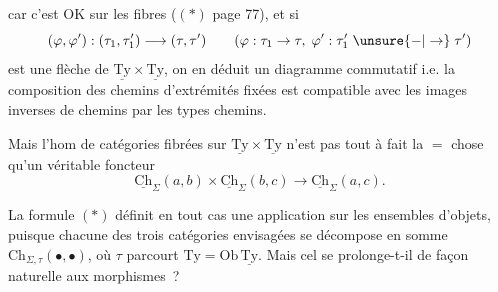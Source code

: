 car c'est OK sur les fibres ($( * )$ page 77), et si
\[
(\varphi,\varphi'):(\tau_1,\tau'_1)\longrightarrow(\tau,\tau')\qquad
(\varphi:\tau_1\to\tau,\;\varphi':\tau'_1\mathrel{\unsure{-|\to}}\tau')
\]
est une flèche de $\underline{\mathrm{Ty}}\times\underline{\mathrm{Ty}}$, on en déduit un diagramme commutatif 
i.e. la composition des chemins  d'extrémités fixées est compatible avec les images inverses de chemins par   les types  chemins.

Mais l'hom  de catégories fibrées sur $\underline{\mathrm{Ty}}\times\underline{\mathrm{Ty}}$ n'est pas tout à fait la $=$ chose qu'un véritable foncteur
\[
\underline{\mathrm{Ch}}_\Sigma(a,b)\times\underline{\mathrm{Ch}}_\Sigma(b,c)\longrightarrow\underline{\mathrm{Ch}}_\Sigma(a,c).\tag*{$(*)$}
\]

La formule $(*)$  définit en tout cas une application sur les ensembles d'objets, puisque  chacune des trois catégories envisagées se décompose en somme  $\mathrm{Ch}_{\Sigma,\tau}(\bullet,\bullet)$, où $\tau$ parcourt $\mathrm{Ty}=\mathrm{Ob}\,\underline{\mathrm{Ty}}$. Mais cel se prolonge-t-il de façon naturelle aux morphismes~? 
